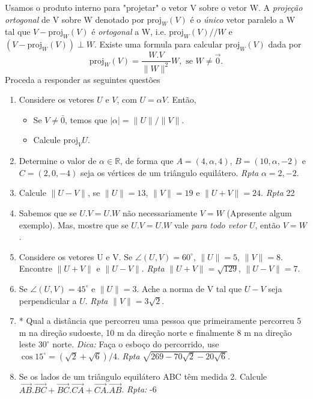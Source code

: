 \documentclass{article}
\theoremstyle{plain}
\theoremstyle{definition}
\theoremstyle{remark}
\begin{document}
Usamos o produto interno para "projetar" o vetor V sobre o vetor W. A {\it projeção ortogonal} de V sobre W 
denotado por $\text{proj}_{W}(V)$ é o {\it único} vetor paralelo a W tal que $V-\text{proj}_{W}(V)$ é {\it ortogonal} a W, i.e.
$\text{proj}_{W}(V) // W$ e $(V-\text{proj}_{W}(V)) \perp W$. 
Existe uma formula para calcular  $\text{proj}_{W}(V)$ dada por 
$$ \text{proj}_{W}(V)= \frac{W.V}{\|W\|^{2}} W, \text{ se } W \neq \overrightarrow{0}.$$
Proceda a responder as seguintes questões 
  \begin{enumerate}
    \item Considere os vetores $U$ e $V$, com $U=\alpha V$.
    Então, 
      \begin{itemize}
      \item Se $V\neq \bar{0}$, temos que $|\alpha|=\|U\|/\|V\|$.
      \item Calcule $\text{proj}_{V}U$.
      \end{itemize}
    \item Determine o valor de $\alpha \in \mathbb{R}$, de forma 
    que $A=(4,\alpha,4)$, $B=(10, \alpha,-2)$ e $C=(2,0,-4)$ seja os vértices de um triângulo equilátero. {\it Rpta} $\alpha=2, -2$.  
    \item Calcule $\|U-V\|$, se $\|U\|=13$, $\|V\|=19$ e $\|U+V\|=24$. {\it Rpta} 22
    \item Sabemos que se $U.V=U.W$ não necessariamente $V=W$ (Apresente algum exemplo). Mas, mostre que se $U.V=U.W$ vale {\it para todo vetor} $U$, então $V=W$.
    \item Considere os vetores U e V. 
    Se $\angle (U,V)=60^{\circ}$, $\|U\|=5$, $\|V\|=8$. Encontre $\|U+V\|$ e $\|U-V\|$. {\it Rpta} $\|U+V\|=\sqrt{129}$, $\|U-V\|=7$.
    \item Se  $\angle (U,V)=45^{\circ}$ e $\|U\|=3$. Ache a norma de V tal que $U-V$ seja perpendicular a $U$. {\it Rpta} 
    $\|V\|=3\sqrt{2}$.
    \item * Qual a distância que percorreu uma pessoa que primeiramente 
    percorreu 5 m na direção sudoeste, 10 m da direção norte e 
    finalmente 8 m na direção leste $30^{\circ}$ norte. 
    {\it Dica:} Faça o esboço do percorrido, use 
    $\cos 15^{\circ}=(\sqrt{2}+\sqrt{6})/4$. 
    {\it Rpta} $\sqrt{269-70\sqrt{2}-20\sqrt{6}}$.
    \item Se os lados de um triângulo equilátero 
    ABC têm medida 2. Calcule 
    $\overrightarrow{AB}.\overrightarrow{BC}+
    \overrightarrow{BC}.\overrightarrow{CA}+
    \overrightarrow{CA}.\overrightarrow{AB}$.
    {\it Rpta: } -6

\end{enumerate}
\end{document}
